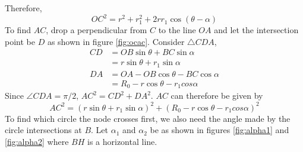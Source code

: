  Therefore, \begin{equation} OC^2 = r^2 + r_1^2 + 2rr_1\cos(\theta-\alpha) \end{equation} To find $AC$, drop a perpendicular from $C$ to the line $OA$ and let the intersection point be $D$ as shown in figure \ref{fig:ocac}. Consider $\bigtriangleup CDA$, 
\begin{align*}
CD &= OB\sin\theta + BC\sin\alpha \\
&= r\sin\theta + r_1\sin\alpha \\
DA &= OA - OB\cos\theta - BC\cos\alpha \\
&= R_0-r\cos\theta-r_1cos\alpha
\end{align*}
Since $\angle CDA = \pi/2$, $AC^2 = CD^2 + DA^2$. $AC$ can therefore be given by 
\begin{equation}
	AC^2 = (r\sin\theta + r_1\sin\alpha)^2 + (R_0-r\cos\theta-r_1cos\alpha)^2
\end{equation}
To find which circle the node crosses first, we also need the angle made by the circle intersections at $B$. Let $\alpha_1$ and $\alpha_2$ be as shown in figures \ref{fig:alpha1} and \ref{fig:alpha2} where $BH$ is a horizontal line. 


